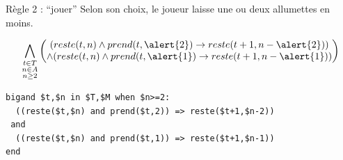 \documentclass[english,french,usenames,dvipsnames]{beamer}
\begin{document}
\begin{frame}[containsverbatim]{\subsecname}
\begin{exampleblock}{Règle 2 : \enquote{jouer}}
Selon son choix, le joueur laisse \alert{une} ou \alert{deux} allumettes en moins.
\end{exampleblock}
\[
\bigwedge_{\substack{t \in T\\ n \in A\\ n \geq 2}} 
\begin{pmatrix}
    (reste(t,n) \wedge prend(t, \alert{2}) \rightarrow reste(t+1,n-\alert{2}))\\
    \wedge (reste(t,n) \wedge prend(t, \alert{1}) \rightarrow  reste(t+1, n-\alert{1}))
\end{pmatrix}
\]
\begin{footnotesize}
\begin{verbatim}
bigand $t,$n in $T,$M when $n>=2:
  ((reste($t,$n) and prend($t,2)) => reste($t+1,$n-2))
 and
  ((reste($t,$n) and prend($t,1)) => reste($t+1,$n-1))
end
\end{verbatim}
\end{footnotesize}
\end{frame}

\end{document}
